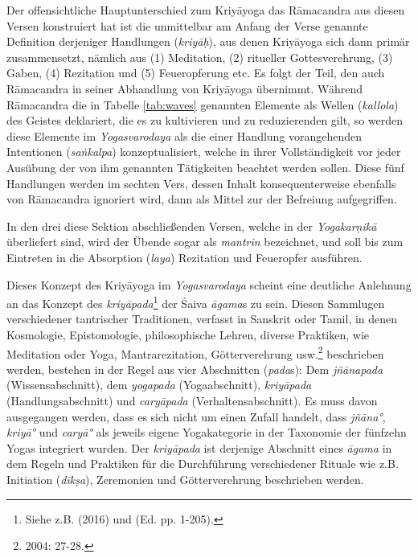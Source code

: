 Der offensichtliche Hauptunterschied zum Kriyāyoga das Rāmacandra aus diesen Versen konstruiert hat ist die unmittelbar am Anfang der Verse genannte Definition derjeniger Handlungen (\textit{kriyāḥ}), aus denen Kriyāyoga sich dann primär zusammensetzt, nämlich aus (1) Meditation, (2) ritueller Gottesverehrung, (3) Gaben, (4) Rezitation und (5) Feueropferung etc. Es folgt der Teil, den auch Rāmacandra in seiner Abhandlung von Kriyāyoga übernimmt. Während Rāmacandra die in Tabelle \ref{tab:waves} genannten Elemente als Wellen (\textit{kallola}) des Geistes deklariert, die es zu kultivieren und zu reduzierenden gilt, so werden diese Elemente im \textit{Yogasvarodaya} als die einer Handlung vorangehenden Intentionen (\textit{saṅkalpa}) konzeptualisiert, welche in ihrer Vollständigkeit vor jeder Ausübung der von ihm genannten Tätigkeiten beachtet werden sollen. Diese fünf Handlungen werden im sechten Vers, dessen Inhalt konsequenterweise ebenfalls von Rāmacandra ignoriert wird, dann als Mittel zur der Befreiung aufgegriffen.

In den drei diese Sektion abschließenden Versen, welche in der \textit{Yogakarṇikā} überliefert sind, wird der Übende sogar als \textit{mantrin} bezeichnet, und soll bis zum Eintreten in die Absorption (\textit{laya}) Rezitation und Feueropfer ausführen.

Dieses Konzept des Kriyāyoga im \textit{Yogasvarodaya} scheint eine deutliche Anlehnung an das Konzept des \textit{kriyāpada}\footnote{Siehe z.B. \citeauthor{ganesan2016saiva} (2016) und  (Ed. pp. 1-205).}  der Śaiva \textit{āgama}s zu sein. Diesen Sammlugen verschiedener tantrischer Traditionen, verfasst in Sanskrit oder Tamil, in denen Kosmologie, Epistomologie, philosophische Lehren, diverse Praktiken, wie Meditation oder Yoga, Mantrarezitation, Götterverehrung usw.\footnote{\citeauthor{lipner2004} 2004: 27-28.} beschrieben werden, bestehen in der Regel aus vier Abschnitten (\textit{pada}s): Dem \textit{jñānapada} (Wissensabschnitt), dem \textit{yogapada} (Yogaabschnitt), \textit{kriyāpada} (Handlungsabschnitt) und \textit{caryāpada} (Verhaltensabschnitt). Es muss davon ausgegangen werden, dass es sich nicht um einen Zufall handelt, dass \textit{jñāna°}, \textit{kriyā°} und \textit{caryā°} als jeweils eigene Yogakategorie in der Taxonomie der fünfzehn Yogas integriert wurden. Der \textit{kriyāpada} ist derjenige Abschnitt eines \textit{āgama} in dem Regeln und Praktiken für die Durchführung verschiedener Rituale wie z.B. Initiation (\textit{dīkṣa}), Zeremonien und Götterverehrung beschrieben werden. 

